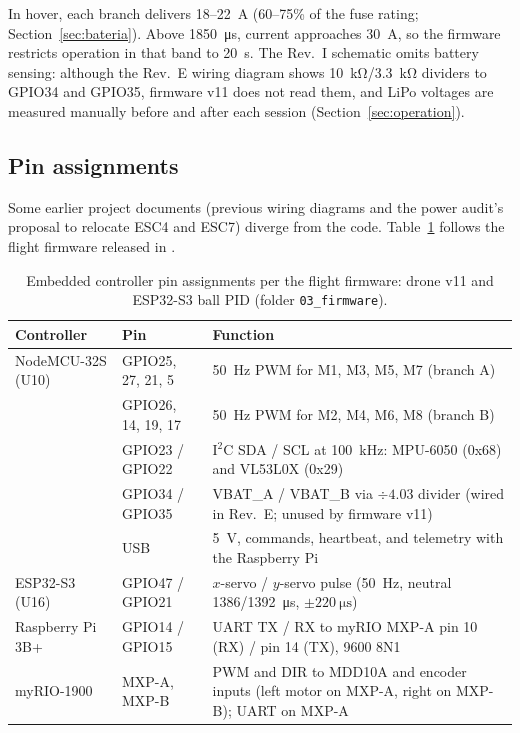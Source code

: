 In hover, each branch delivers 18--\SI{22}{\ampere} (60--75\% of the fuse rating; Section~\ref{sec:bateria}). Above \SI{1850}{\micro\second}, current approaches \SI{30}{\ampere}, so the firmware restricts operation in that band to \SI{20}{\second}. The Rev.~I schematic omits battery sensing: although the Rev.~E wiring diagram shows \SI{10}{\kilo\ohm}/\SI{3.3}{\kilo\ohm} dividers to GPIO34 and GPIO35, firmware v11 does not read them, and LiPo voltages are measured manually before and after each session (Section~\ref{sec:operation}).

\subsection{Pin assignments}
\label{sec:pins}
Some earlier project documents (previous wiring diagrams and the power audit's proposal to relocate ESC4 and ESC7) diverge from the code. Table~\ref{tab:pins} follows the flight firmware released in .

\begin{table}[!htbp]
\centering
\caption{Embedded controller pin assignments per the flight firmware: drone v11 and ESP32-S3 ball PID (folder \texttt{03\_firmware}).}
\label{tab:pins}
\small
\begin{tabularx}{\textwidth}{@{}llX@{}}
\toprule
Controller & Pin & Function \\
\midrule
NodeMCU-32S (U10) & GPIO25, 27, 21, 5 & \SI{50}{\hertz} PWM for M1, M3, M5, M7 (branch A) \\
 & GPIO26, 14, 19, 17 & \SI{50}{\hertz} PWM for M2, M4, M6, M8 (branch B) \\
 & GPIO23 / GPIO22 & I$^2$C SDA / SCL at \SI{100}{\kilo\hertz}: MPU-6050 (0x68) and VL53L0X (0x29) \\
 & GPIO34 / GPIO35 & VBAT\_A / VBAT\_B via $\div4.03$ divider (wired in Rev.~E; unused by firmware v11) \\
 & USB & \SI{5}{\volt}, commands, heartbeat, and telemetry with the Raspberry Pi \\
ESP32-S3 (U16) & GPIO47 / GPIO21 & $x$-servo / $y$-servo pulse (\SI{50}{\hertz}, neutral 1386/\SI{1392}{\micro\second}, $\pm\SI{220}{\micro\second}$) \\
Raspberry Pi 3B+ & GPIO14 / GPIO15 & UART TX / RX to myRIO MXP-A pin 10 (RX) / pin 14 (TX), 9600 8N1 \\
myRIO-1900 & MXP-A, MXP-B & PWM and DIR to MDD10A and encoder inputs (left motor on MXP-A, right on MXP-B); UART on MXP-A \\
\bottomrule
\end{tabularx}
\end{table}

